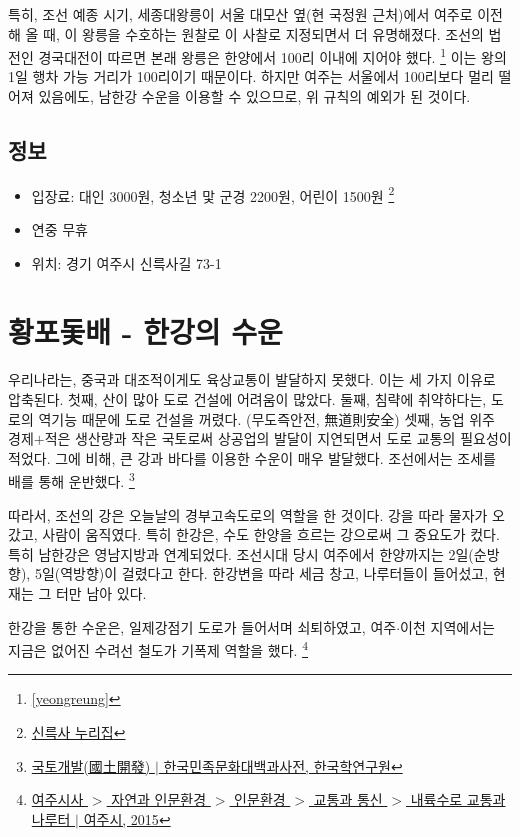 \documentclass[chapter, oneside]{oblivoir}
\begin{document}
특히, 조선 예종 시기, 세종대왕릉이 서울 대모산 옆(현 국정원 근처)에서 여주로 이전해 올 때,
이 왕릉을 수호하는 원찰로 이 사찰로 지정되면서 더 유명해졌다.
조선의 법전인 경국대전이 따르면 본래 왕릉은 한양에서 100리 이내에 지어야 했다. 
\footnote{\ref{yeongreung}}
이는 왕의 1일 행차 가능 거리가 100리이기 때문이다.
하지만 여주는 서울에서 100리보다 멀리 떨어져 있음에도, 남한강 수운을 이용할 수 있으므로,
위 규칙의 예외가 된 것이다.

\subsection{정보}
\begin{itemize}
    \item 입장료: 대인 3000원, 청소년 맟 군경 2200원, 어린이 1500원 
    \footnote{\href{http://www.silleuksa.org/}{신륵사 누리집}}
    \item 연중 무휴
    \item 위치: 경기 여주시 신륵사길 73-1
\end{itemize}

\section{황포돛배 - 한강의 수운}

우리나라는, 중국과 대조적이게도 육상교통이 발달하지 못했다. 이는 세 가지 이유로 압축된다.
첫째, 산이 많아 도로 건설에 어려움이 많았다. 
둘째, 침략에 취약하다는, 도로의 역기능 때문에 도로 건설을 꺼렸다. (무도즉안전, 無道則安全)
셋째, 농업 위주 경제$+$적은 생산량과 작은 국토로써 상공업의 발달이 지연되면서 도로 교통의 필요성이 적었다.
그에 비해, 큰 강과 바다를 이용한 수운이 매우 발달했다. 조선에서는 조세를 배를 통해 운반했다. 
\footnote{\href{http://encykorea.aks.ac.kr/Contents/Item/E0006539}{국토개발(國土開發) $|$ 한국민족문화대백과사전, 한국학연구원}}


따라서, 조선의 강은 오늘날의 경부고속도로의 역할을 한 것이다. 강을 따라 물자가 오갔고, 사람이 움직였다.
특히 한강은, 수도 한양을 흐르는 강으로써 그 중요도가 컸다. 특히 남한강은 영남지방과 연계되었다. 
조선시대 당시 여주에서 한양까지는 2일(순방향), 5일(역방향)이 걸렸다고 한다.
한강변을 따라 세금 창고, 나루터들이 들어섰고, 현재는 그 터만 남아 있다.


한강을 통한 수운은, 일제강점기 도로가 들어서며 쇠퇴하였고, 
여주$\cdot$이천 지역에서는 지금은 없어진 수려선 철도가 기폭제 역할을 했다.
\footnote{ \href{https://www.yeoju.go.kr/history/jsp/Theme/Theme.jsp?BC_ID=a0085}{여주시사 $>$ 자연과 인문환경 $>$ 인문환경 $>$ 교통과 통신 $>$ 내륙수로 교통과 나루터 $|$ 여주시, 2015}}
\end{document}

